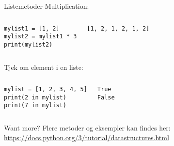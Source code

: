 \begin{frame}[fragile]{Listemetoder}
	Multiplication:
	\begin{columns}
		\begin{lstlisting}[style=python]
mylist1 = [1, 2]
mylist2 = mylist1 * 3
print(mylist2)
		\end{lstlisting}
		\begin{lstlisting}[style=python]
[1, 2, 1, 2, 1, 2]
		\end{lstlisting}
	\end{columns}
	\pause
	Tjek om element i en liste:
	\begin{columns}
		\column{0.4\textwidth}
		\begin{lstlisting}[style=python]
mylist = [1, 2, 3, 4, 5]
print(2 in mylist)
print(7 in mylist)
		\end{lstlisting}
		\column{0.4\textwidth}
		\begin{lstlisting}[style=python]
True
False
		\end{lstlisting}
	\end{columns}
\end{frame}

\begin{frame}{Want more?}
	Flere metoder og eksempler kan findes her:\\
	\url{https://docs.python.org/3/tutorial/datastructures.html}
\end{frame}


